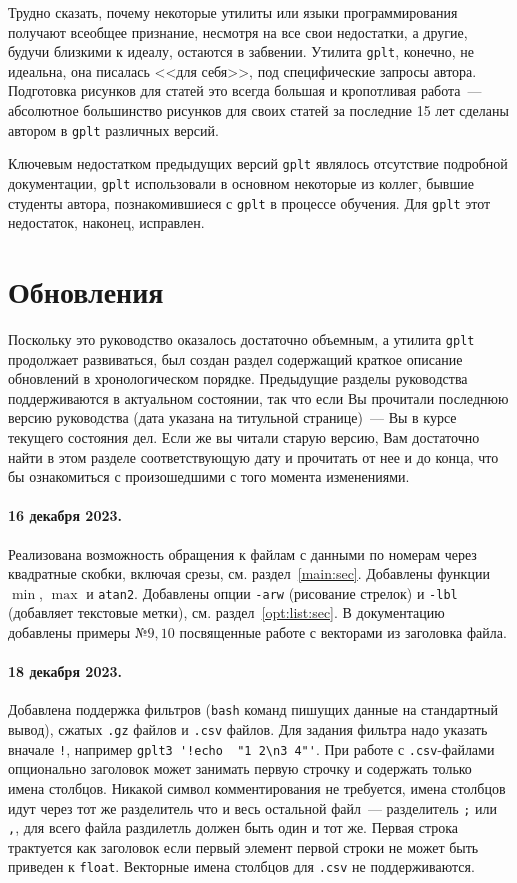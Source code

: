 \documentclass[12pt]{article}
\def\gplt{{\tt gplt}}
\begin{document}
Трудно сказать, почему некоторые утилиты или языки программирования получают всеобщее признание, несмотря на все свои недостатки,
а другие, будучи близкими к идеалу, остаются в забвении. 
Утилита \gplt{}, конечно, не идеальна, она писалась <<для себя>>, под специфические запросы автора.
Подготовка рисунков для статей это всегда большая и кропотливая работа~---
абсолютное большинство рисунков для своих статей за последние 15 лет сделаны автором в \verb'gplt' различных версий.

Ключевым недостатком предыдущих версий \verb'gplt' являлось отсутствие подробной документации,
\verb'gplt' использовали в основном некоторые из коллег, бывшие студенты автора, познакомившиеся с \verb'gplt'
в процессе обучения. Для \gplt{}  этот недостаток, наконец, исправлен. 




\appendix\section{Обновления}
Поскольку это руководство оказалось достаточно объемным, а утилита \gplt{} продолжает развиваться, был создан раздел содержащий краткое описание обновлений
в хронологическом порядке. Предыдущие разделы руководства поддерживаются в актуальном состоянии, так что если Вы прочитали последнюю версию руководства
(дата указана на титульной странице)~--- Вы в курсе текущего состояния дел. Если же вы читали старую версию, Вам достаточно найти в этом разделе
соответствующую дату и прочитать от нее и до конца, что бы ознакомиться с произошедшими с того момента изменениями.

\paragraph{16 декабря 2023.} Реализована возможность обращения к файлам с данными по номерам через квадратные скобки, включая срезы,
см. раздел~\ref{main:sec}. Добавлены функции $\min$, $\max$ и \verb'atan2'. Добавлены опции \verb'-arw' (рисование стрелок) и \verb'-lbl' (добавляет текстовые метки),
см. раздел~\ref{opt:list:sec}.
В документацию добавлены примеры №$9, 10$ посвященные работе с векторами из заголовка файла.

\paragraph{18 декабря 2023.} Добавлена поддержка фильтров (\verb'bash' команд пишущих данные на стандартный вывод), сжатых \verb'.gz' файлов  и \verb'.csv' файлов.
Для задания фильтра надо указать вначале \verb'!', например \verb|gplt3 '!echo  "1 2\n3 4"'|.
При работе с \verb'.csv'-файлами опционально заголовок может занимать первую строчку и содержать только имена столбцов. Никакой символ комментирования не требуется,
имена столбцов идут через тот же разделитель что и весь остальной файл~--- разделитель \verb';' или \verb',', для всего файла раздилетль должен быть один и тот же.
Первая строка трактуется как заголовок если первый элемент первой строки не может быть приведен к \verb'float'.
Векторные имена столбцов для \verb'.csv' не поддерживаются. 
\end{document}
